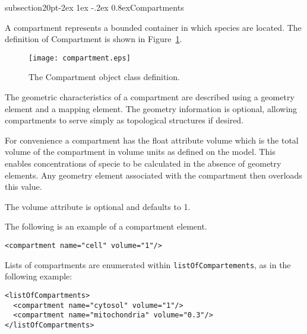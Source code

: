\documentclass[10pt]{article}
\makeatletter
\renewcommand{\subsection}{\@startsection%
  {subsection}{2}{0pt}{-2ex \@plus 1ex \@minus -.2ex}%
  {0.8ex}{\slshape\large\bfseries}}
\newcommand{\tightspacing}{\renewcommand{\baselinestretch}{0.85}}
\newcommand{\regularspacing}{\renewcommand{\baselinestretch}{1.0}}
\newcommand{\class}[1]{\textsf{#1}}
\newcommand{\attrib}[1]{\textsf{#1}}
\makeatother
\begin{document}

\subsection{Compartments}

A \class{compartment} represents a bounded container in which
species are located. The definition of \class{Compartment} is
shown in Figure~\ref{fig:compartment}.

\begin{figure}[h]
  \centering
  \texttt{[image: compartment.eps]}
  \caption{The \class{Compartment} object class definition.}
  \label{fig:compartment}
\end{figure}

The geometric characteristics of a compartment are described
using a \class{geometry} element and a \class{mapping} element.
The geometry information is optional, allowing compartments to
serve simply as topological structures if desired.

For convenience a compartment has the float attribute
\attrib{volume} which is the total volume of the compartment in
volume units as defined on the \class{model}.  This enables
concentrations of specie to be calculated in the absence of
geometry elements.  Any geometry element associated with the
compartment then overloads this value.

The volume attribute is optional and defaults to 1.

The following is an example of a \class{compartment} element.

\begin{small}
\tightspacing
\begin{verbatim}
<compartment name="cell" volume="1"/>
\end{verbatim}
\regularspacing
\end{small}

Lists of compartments are enumerated within {\tt listOfCompartements},
as in the following example:

\begin{small}
\tightspacing
\begin{verbatim}
<listOfCompartments>
  <compartment name="cytosol" volume="1"/>
  <compartment name="mitochondria" volume="0.3"/>
</listOfCompartments>
\end{verbatim}
\regularspacing
\end{small}
\end{document}

